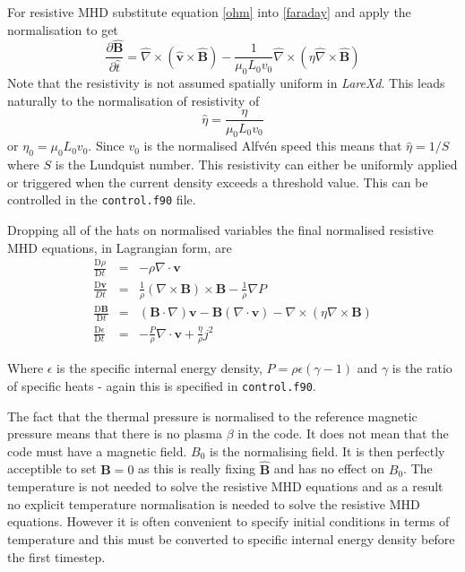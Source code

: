 \documentclass[11pt]{article}
\begin{document}
For resistive MHD substitute equation \ref{ohm} into \ref{faraday} and apply the normalisation to get
\begin{displaymath}
 \frac{\partial \hat{\mathbf{B}}}{\partial \hat{t}}=\hat{\nabla}\times(\hat{\mathbf{v}}\times\hat{\mathbf{B}})
	-\frac{1}{\mu_0 L_0 v_0}\hat{\nabla}\times(\eta\hat{\nabla}\times\hat{\mathbf{B}})
\end{displaymath}
Note that the resistivity is not assumed spatially uniform in {\it LareXd}. This leads naturally to the normalisation of resistivity of
\begin{displaymath}
 \hat{\eta}=\frac{\eta}{\mu_0 L_0 v_0}
\end{displaymath}
or $\eta_0=\mu_0 L_0 v_0$. Since $v_0$ is the normalised Alfv\'en speed this means that $\hat{\eta}=1/S$ where $S$ is the Lundquist number. This resistivity can either be uniformly applied or triggered when the current density exceeds a threshold value. This can be controlled in the \texttt{control.f90} file.

Dropping all of the hats on normalised variables the final normalised resistive MHD equations, in Lagrangian form, are
\begin{eqnarray}
\frac{\mathrm{D}\rho}{\mathrm{D}t}&=&-\rho \nabla\cdot \mathbf{v}\\
\frac{\mathrm{D}\mathbf{v}}{Dt}&=&\frac{1}{\rho}(\nabla\times\mathbf{B})\times\mathbf{B}
-\frac{1}{\rho}\nabla P \label{velocity_eqn}\\
\frac{\mathrm{D}\mathbf{B}}{\mathrm{D}t}&=&(\mathbf{B}\cdot\nabla)\mathbf{v}-\mathbf{B}
(\nabla\cdot\mathbf{v})-\nabla\times(\eta\nabla\times\mathbf{B})\\
\frac{\mathrm{D}\epsilon}{\mathrm{D}t}&=&-\frac{P}{\rho}\nabla\cdot\mathbf{v}+\frac
{\eta}{\rho}j^{2} \label{energy_eqn}
\end{eqnarray}

Where $\epsilon$ is the specific internal energy density, $P = \rho \epsilon(\gamma - 1)$ and $\gamma$ is the ratio of specific heats - again this is specified in \texttt{control.f90}.

The fact that the thermal pressure is normalised to the reference magnetic pressure means that there is no plasma $\beta$ in the code. It does not mean that the code must have a magnetic field. $B_0$ is the normalising field. It is then perfectly acceptible to set $\mathbf{B}=0$ as this is really fixing $\hat{\mathbf{B}}$ and has no effect on  $B_0$. The temperature is not needed to solve the resistive MHD equations and as a result no explicit temperature normalisation is needed to solve the resistive MHD equations. However it is often convenient to specify initial conditions in terms of temperature and this must be converted to specific internal energy density before the first timestep.
\end{document}
